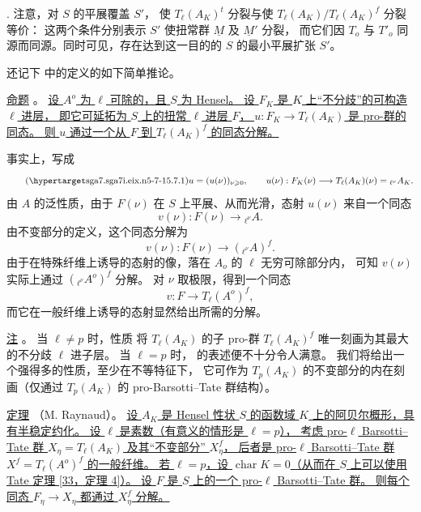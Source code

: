 \medskip
\noindent
{}. 注意，对 $S$ 的平展覆盖 $S'$，
使 $T_\ell(A_K)^t$ 分裂与使 $T_\ell(A_K)/T_\ell(A_K)^f$ 分裂等价：
这两个条件分别表示 $S'$ 使扭常群 $\underline M$ 及 $\underline M'$ 分裂，
而它们因 $T_o$ 与 $T'_o$ 同源而同源。同时可见，存在达到这一目的的 $S$ 的最小平展扩张 $S'$。

还记下  中的定义的如下简单推论。


\par\medskip
\noindent
\underline{命题} 。
\underline{设 $A^o$ 为 $\ell$ 可除的，且 $S$ 为 Hensel。
设 $F_K$ 是 $K$ 上“不分歧”的可构造 $\ell$ 进层，
即它可延拓为 $S$ 上的扭常 $\ell$ 进层 $F$，
$u:F_K\longrightarrow T_\ell(A_K)$ 是 pro-群的同态。
则 $u$ 通过一个从 $F$ 到 $T_\ell(A_K)^f$ 的同态分解。}

事实上，写成
\begin{equation}\tag{\SGARefTarget{sga7.sga7i.eix.n5-7-1}{5.7.1}}
 u=(u(\nu))_{\nu\geqslant0},\qquad
 u(\nu):F_K(\nu)\longrightarrow T_\ell(A_K)(\nu)
 ={}_{\ell^\nu}A_K.
\end{equation}
由 $A$ 的泛性质，由于 $F(\nu)$ 在 $S$ 上平展、从而光滑，态射 $u(\nu)$ 来自一个同态
\[
 v(\nu):F(\nu)\longrightarrow{}_{\ell^\nu}A.
\]
由不变部分的定义，这个同态分解为
\[
 v(\nu):F(\nu)\longrightarrow({}_{\ell^\nu}A)^f.
\]
由于在特殊纤维上诱导的态射的像，落在 $A_o$ 的 $\ell$ 无穷可除部分内，
可知 $v(\nu)$ 实际上通过 $({}_{\ell^\nu}A^o)^f$ 分解。
对 $\nu$ 取极限，得到一个同态
\[
 v:F\longrightarrow T_\ell(A^o)^f,
\]
而它在一般纤维上诱导的态射显然给出所需的分解。

\medskip
\noindent
\underline{注} 。
当 $\ell\neq p$ 时，性质  将 $T_\ell(A_K)$ 的子 pro-群
$T_\ell(A_K)^f$ 唯一刻画为其最大的不分歧 $\ell$ 进子层。
当 $\ell=p$ 时， 的表述便不十分令人满意。
我们将给出一个强得多的性质，至少在不等特征下，
它可作为 $T_p(A_K)$ 的不变部分的内在刻画（仅通过 $T_p(A_K)$ 的 pro-Barsotti--Tate 群结构）。

\medskip
\noindent
\underline{定理} （M. Raynaud）。
\underline{设 $A_K$ 是 Hensel 性状 $S$ 的函数域 $K$ 上的阿贝尔概形，具有半稳定约化。
设 $\ell$ 是素数（有意义的情形是 $\ell=p$），
考虑 pro-$\ell$ Barsotti--Tate 群 $X_\eta=T_\ell(A_K)$ 及其“不变部分” $X_\eta^f$，
后者是 pro-$\ell$ Barsotti--Tate 群 $X^f=T_\ell(A^o)^f$ 的一般纤维。
若 $\ell=p$，设 $\operatorname{char}K=0$（从而在 $S$ 上可以使用 Tate 定理 [33，定理 4]）。
设 $F$ 是 $S$ 上的一个 pro-$\ell$ Barsotti--Tate 群。
则每个同态 $F_\eta\longrightarrow X_\eta$ 都通过 $X_\eta^f$ 分解。}

